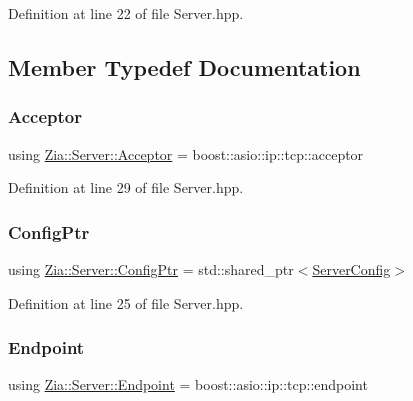 Definition at line 22 of file Server.\+hpp.



\subsection{Member Typedef Documentation}
\mbox{\label{class_zia_1_1_server_a0119259e0eaa12e4f688c6c64dbf6ac0}} 
\subsubsection{\texorpdfstring{Acceptor}{Acceptor}}
{\footnotesize\ttfamily using \hyperlink{class_zia_1_1_server_a0119259e0eaa12e4f688c6c64dbf6ac0}{Zia\+::\+Server\+::\+Acceptor} =  boost\+::asio\+::ip\+::tcp\+::acceptor}



Definition at line 29 of file Server.\+hpp.

\mbox{\label{class_zia_1_1_server_a10861064c5ac1dc97cc537023d67471d}} 
\subsubsection{\texorpdfstring{Config\+Ptr}{ConfigPtr}}
{\footnotesize\ttfamily using \hyperlink{class_zia_1_1_server_a10861064c5ac1dc97cc537023d67471d}{Zia\+::\+Server\+::\+Config\+Ptr} =  std\+::shared\+\_\+ptr$<$\hyperlink{class_zia_1_1_server_config}{Server\+Config}$>$}



Definition at line 25 of file Server.\+hpp.

\mbox{\label{class_zia_1_1_server_a4764ec255c11f5b7fb87f5ab1d44e952}} 
\subsubsection{\texorpdfstring{Endpoint}{Endpoint}}
{\footnotesize\ttfamily using \hyperlink{class_zia_1_1_server_a4764ec255c11f5b7fb87f5ab1d44e952}{Zia\+::\+Server\+::\+Endpoint} =  boost\+::asio\+::ip\+::tcp\+::endpoint}



